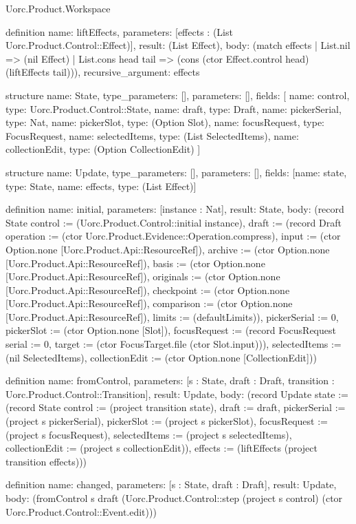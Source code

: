 \begin{lexlean}{Uorc.Product.Workspace}
\begin{semanticmodule}
definition{
  name: liftEffects,
  parameters: [effects : (List Uorc.Product.Control::Effect)],
  result: (List Effect),
  body: (match effects
    | List.nil => (nil Effect)
    | List.cons head tail => (cons (ctor Effect.control head) (liftEffects tail))),
  recursive_argument: effects
}

structure{
  name: State,
  type_parameters: [],
  parameters: [],
  fields: [
    {name: control, type: Uorc.Product.Control::State},
    {name: draft, type: Draft},
    {name: pickerSerial, type: Nat},
    {name: pickerSlot, type: (Option Slot)},
    {name: focusRequest, type: FocusRequest},
    {name: selectedItems, type: (List SelectedItems)},
    {name: collectionEdit, type: (Option CollectionEdit)}
  ]
}

structure{
  name: Update,
  type_parameters: [],
  parameters: [],
  fields: [{name: state, type: State}, {name: effects, type: (List Effect)}]
}

definition{
  name: initial,
  parameters: [instance : Nat],
  result: State,
  body: (record State {control := (Uorc.Product.Control::initial instance), draft := (record Draft {operation := (ctor Uorc.Product.Evidence::Operation.compress), input := (ctor Option.none [Uorc.Product.Api::ResourceRef]), archive := (ctor Option.none [Uorc.Product.Api::ResourceRef]), basis := (ctor Option.none [Uorc.Product.Api::ResourceRef]), originals := (ctor Option.none [Uorc.Product.Api::ResourceRef]), checkpoint := (ctor Option.none [Uorc.Product.Api::ResourceRef]), comparison := (ctor Option.none [Uorc.Product.Api::ResourceRef]), limits := (defaultLimits)}), pickerSerial := 0, pickerSlot := (ctor Option.none [Slot]), focusRequest := (record FocusRequest {serial := 0, target := (ctor FocusTarget.file (ctor Slot.input))}), selectedItems := (nil SelectedItems), collectionEdit := (ctor Option.none [CollectionEdit])})
}

definition{
  name: fromControl,
  parameters: [s : State, draft : Draft, transition : Uorc.Product.Control::Transition],
  result: Update,
  body: (record Update {state := (record State {control := (project transition state), draft := draft, pickerSerial := (project s pickerSerial), pickerSlot := (project s pickerSlot), focusRequest := (project s focusRequest), selectedItems := (project s selectedItems), collectionEdit := (project s collectionEdit)}), effects := (liftEffects (project transition effects))})
}

definition{
  name: changed,
  parameters: [s : State, draft : Draft],
  result: Update,
  body: (fromControl s draft (Uorc.Product.Control::step (project s control) (ctor Uorc.Product.Control::Event.edit)))
}


\end{semanticmodule}
\end{lexlean}
